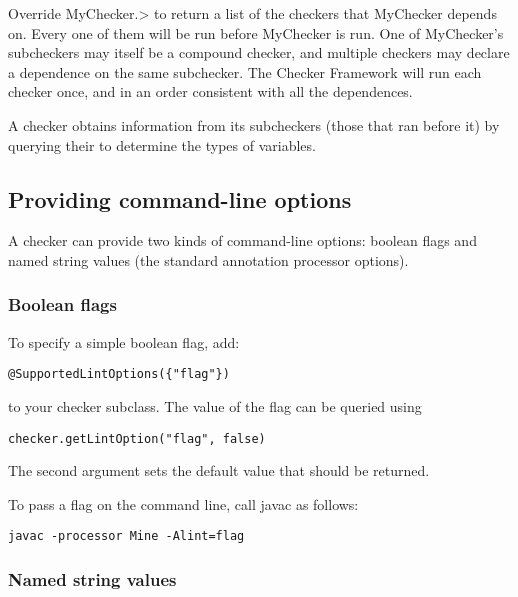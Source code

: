 \begin{enumerate}
Override 
\<MyChecker.>
to return a list of the checkers that MyChecker depends on.  Every one of
them will be run before MyChecker is run.  One of MyChecker's subcheckers
may itself be a compound checker, and multiple checkers may declare a
dependence on the same subchecker.  The Checker Framework will run each
checker once, and in an order consistent with all the dependences.

A checker obtains information from its subcheckers (those that ran before
it) by querying their  to
determine the types of variables.

\end{enumerate}



\subsection{Providing command-line options\label{providing-command-line-options}}

A checker can provide two kinds of command-line options:
boolean flags and
named string values (the standard annotation processor
options).

\subsubsection{Boolean flags\label{providing-command-line-options-boolean-flags}}

To specify a simple boolean flag, add:

\begin{Verbatim}
@SupportedLintOptions({"flag"})
\end{Verbatim}

to your checker subclass.
The value of the flag can be queried using

\begin{Verbatim}
checker.getLintOption("flag", false)
\end{Verbatim}

The second argument sets the default value that should be returned.

To pass a flag on the command line, call javac as follows:

\begin{Verbatim}
javac -processor Mine -Alint=flag
\end{Verbatim}


\subsubsection{Named string values\label{providing-command-line-options-named-string-values}}

